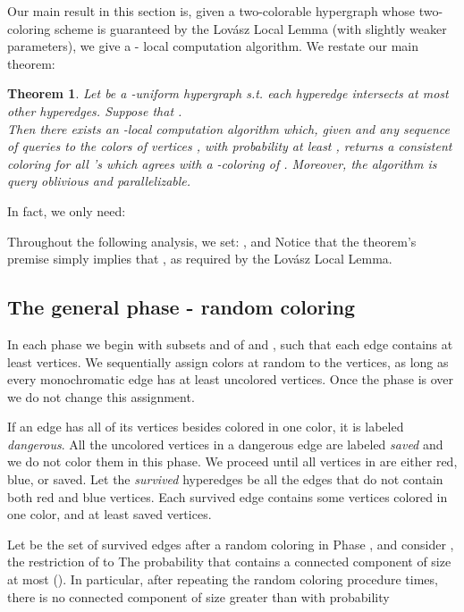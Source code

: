 \documentclass[english, oribibl]{llncs}
\newtheorem{theorem}{Theorem}[section]
\begin{document}
Our main result in this section is,
given a two-colorable hypergraph  whose two-coloring scheme is guaranteed by
the Lov{\'{a}}sz Local Lemma (with slightly weaker parameters),
we give a  - local computation algorithm.
We restate our main theorem:

\begin{theorem}
Let  be a -uniform hypergraph s.t. each hyperedge intersects at most  other hyperedges.
Suppose that . \\
Then there exists an  -local computation algorithm which, given  and any sequence of
queries to the colors of vertices  , 
with probability at least ,
returns a consistent coloring for all 's which 
agrees with a -coloring of . 
Moreover, the algorithm is query oblivious and parallelizable. 
\end{theorem}


In fact, we only need:

Throughout the following analysis, we set: 
, and 
Notice that the theorem's premise simply implies that , as required by the Lov{\'{a}}sz Local Lemma.



\subsection{The general phase - random coloring}
In each phase we begin with subsets  and  of  and ,
such that each edge contains at least  vertices.
We sequentially assign colors at random to the vertices, as long as every monochromatic edge
has at least  uncolored vertices.
Once the phase is over we do not change this assignment.

If an edge has all of its vertices besides  colored in one color, it is labeled \emph{dangerous}. 
All the uncolored vertices in a dangerous edge are labeled \emph{saved} and we do not color them in this phase.
We proceed until all vertices in  are either red, blue, or saved.
Let the \emph{survived} hyperedges be all the edges that do not contain both red and blue vertices.
Each survived edge contains some vertices colored in one color, and at least  saved vertices.

Let  be the set of survived edges after a random coloring in Phase , and consider , the restriction of  to 
The probability that  contains a connected component of size  at most  (\cite{Alo91}).
In particular, after repeating the random coloring procedure  times, 
there is no connected component of size greater than  with probability
\end{document}
